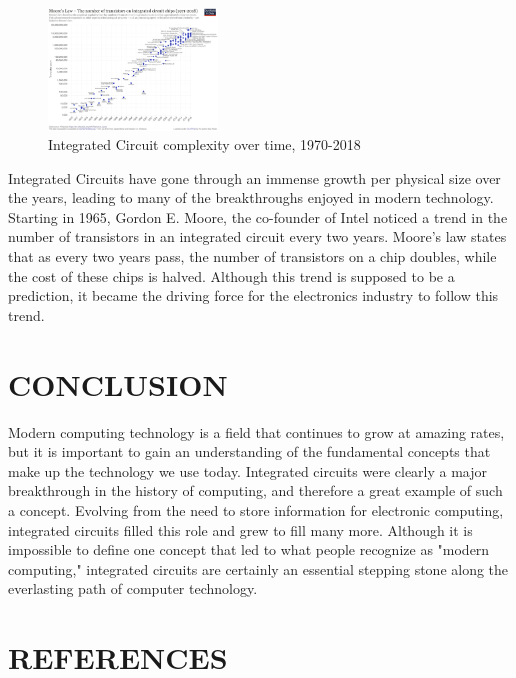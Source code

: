 \documentclass[letterpaper, 10 pt, conference]{IEEEconf}
\begin{document}
\begin{figure}[h!]
\centering
\captionsetup{justification=centering}
\includegraphics[width=0.4\textwidth]{Moore's_Law_Transistor_Count_1971-2018.png}
\caption{Integrated Circuit complexity over time, 1970-2018}
\label{fig:example}
\end{figure} 


Integrated Circuits have gone through an immense growth per physical size over the years, leading to many of the breakthroughs enjoyed in modern technology. Starting in 1965, Gordon E. Moore, the co-founder of Intel noticed a trend in the number of transistors in an integrated circuit every two years. Moore’s law states that as every two years pass, the number of transistors on a chip doubles, while the cost of these chips is halved. Although this trend is supposed to be a prediction, it became the driving force for the electronics industry to follow this trend.

\section{CONCLUSION}

Modern computing technology is a field that continues to grow at amazing rates, but it is important to gain an understanding of the fundamental concepts that make up the technology we use today. Integrated circuits were clearly a major breakthrough in the history of computing, and therefore a great example of such a concept. Evolving from the need to store information for electronic computing, integrated circuits filled this role and grew to fill many more. Although it is impossible to define one concept that led to what people recognize as "modern computing," integrated circuits are certainly an essential stepping stone along the everlasting path of computer technology.

\section*{REFERENCES}
\end{document}
